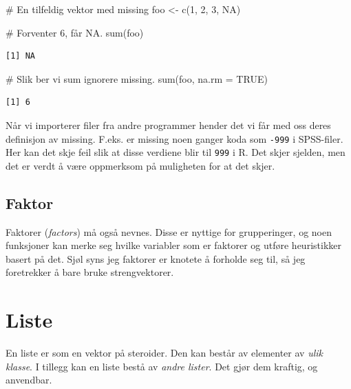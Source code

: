 \documentclass[
  letterpaper,
  DIV=11,
  numbers=noendperiod]{scrreprt}
\newenvironment{Shaded}{\begin{snugshade}}{\end{snugshade}}
\newcommand{\AttributeTok}[1]{\textcolor[rgb]{0.40,0.45,0.13}{#1}}
\newcommand{\CommentTok}[1]{\textcolor[rgb]{0.37,0.37,0.37}{#1}}
\newcommand{\ConstantTok}[1]{\textcolor[rgb]{0.56,0.35,0.01}{#1}}
\newcommand{\DecValTok}[1]{\textcolor[rgb]{0.68,0.00,0.00}{#1}}
\newcommand{\FunctionTok}[1]{\textcolor[rgb]{0.28,0.35,0.67}{#1}}
\newcommand{\NormalTok}[1]{\textcolor[rgb]{0.00,0.23,0.31}{#1}}
\newcommand{\OtherTok}[1]{\textcolor[rgb]{0.00,0.23,0.31}{#1}}
\begin{document}
\begin{Shaded}
\begin{Highlighting}[]
\CommentTok{\# En tilfeldig vektor med missing}
\NormalTok{foo }\OtherTok{\textless{}{-}} \FunctionTok{c}\NormalTok{(}\DecValTok{1}\NormalTok{, }\DecValTok{2}\NormalTok{, }\DecValTok{3}\NormalTok{, }\ConstantTok{NA}\NormalTok{)}

\CommentTok{\# Forventer 6, får NA.}
\FunctionTok{sum}\NormalTok{(foo)}
\end{Highlighting}
\end{Shaded}

\begin{verbatim}
[1] NA
\end{verbatim}

\begin{Shaded}
\begin{Highlighting}[]
\CommentTok{\# Slik ber vi sum ignorere missing.}
\FunctionTok{sum}\NormalTok{(foo, }\AttributeTok{na.rm =} \ConstantTok{TRUE}\NormalTok{)}
\end{Highlighting}
\end{Shaded}

\begin{verbatim}
[1] 6
\end{verbatim}

Når vi importerer filer fra andre programmer hender det vi får med oss
deres definisjon av missing. F.eks. er missing noen ganger koda som
\texttt{-999} i SPSS-filer. Her kan det skje feil slik at disse verdiene
blir til \texttt{999} i R. Det skjer sjelden, men det er verdt å være
oppmerksom på muligheten for at det skjer.

\hypertarget{faktor}{%
\subsection{Faktor}\label{faktor}}

Faktorer (\emph{factors}) må også nevnes. Disse er nyttige for
grupperinger, og noen funksjoner kan merke seg hvilke variabler som er
faktorer og utføre heuristikker basert på det. Sjøl syns jeg faktorer er
knotete å forholde seg til, så jeg foretrekker å bare bruke
strengvektorer.

\hypertarget{liste}{%
\section{Liste}\label{liste}}

En liste er som en vektor på steroider. Den kan består av elementer av
\emph{ulik klasse}. I tillegg kan en liste bestå av \emph{andre lister}.
Det gjør dem kraftig, og anvendbar.
\end{document}
